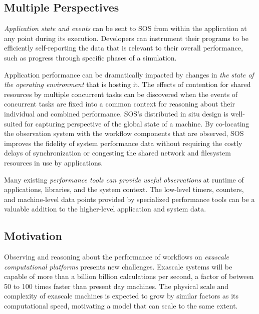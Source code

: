 \subsection{Multiple Perspectives} %
%
\textit{Application state and events} can be sent to SOS from
within the application at any point during its execution.
%
Developers can instrument their programs to be efficiently self-reporting
the data that is relevant to their overall performance, such as progress
through specific phases of a simulation.
%
\par
%

Application performance can be dramatically impacted by changes in
\textit{the state of the operating environment} that is hosting it.
%
The effects of contention for shared resources by multiple concurrent
tasks can be discovered when the events of concurrent tasks are fixed
into a common context for reasoning about their individual and
combined performance.
%
SOS's distributed in situ design is well-suited for capturing
perspective of the global state of a machine.
%
By co-locating the observation system with the workflow components
that are observed, SOS improves the fidelity of system performance
data without requiring the costly delays of synchronization or
congesting the shared network and filesystem resources in use by
applications.
%
\par
%
Many existing \textit{performance tools can provide useful
  observations} at runtime of applications, libraries, and the system
context.
%
The low-level timers, counters, and machine-level data points provided
by specialized performance tools can be a valuable addition to the
higher-level application and system data.
%
\subsection{Motivation}
%
Observing and reasoning about the performance of workflows on
\textit{exascale computational platforms} presents new challenges.
%
Exascale systems will be capable of more than a billion billion
calculations per second, a factor of between 50 to 100 times
faster than present day machines.
%
The physical scale and complexity of exascale machines is expected to
grow by similar factors as its computational speed, motivating a model
that can scale to the same extent.
%
%





